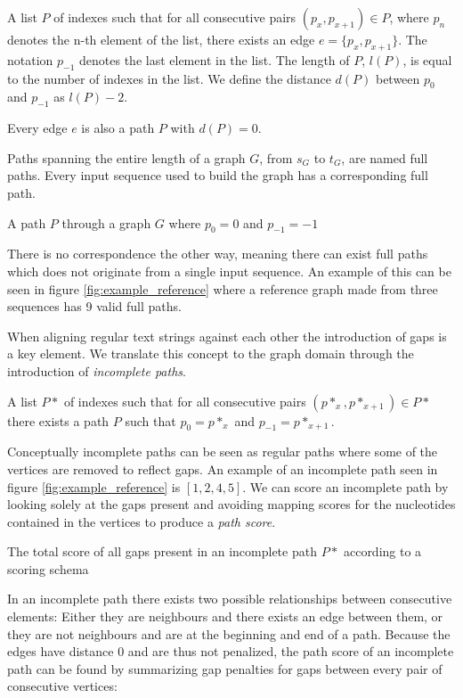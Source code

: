 \documentclass[thesis.tex]{subfiles}
\begin{document}
{\begin{defn}
  A list $P$ of indexes such that for all consecutive pairs $(p_x, p_{x+1}) \in P$, where $p_n$ denotes the n-th element of the list, there exists an edge $e=\{p_x, p_{x+1}\}$. The notation $p_{-1}$ denotes the last element in the list. The length of $P$, $l(P)$, is equal to the number of indexes in the list. We define the distance $d(P)$ between $p_0$ and $p_{-1}$ as $l(P) - 2$.
\end{defn}
\begin{corollary}
  Every edge $e$ is also a path $P$ with $d(P)=0$.
\end{corollary}
Paths spanning the entire length of a graph $G$, from $s_G$ to $t_G$, are named full paths. Every input sequence used to build the graph has a corresponding full path.
\begin{defn}
  A path $P$ through a graph $G$ where $p_0=0$ and $p_{-1}=-1$
\end{defn}
There is no correspondence the other way, meaning there can exist full paths which does not originate from a single input sequence. An example of this can be seen in figure \ref{fig:example_reference} where a reference graph made from three sequences has 9 valid full paths.\\
\par\noindent
When aligning regular text strings against each other the introduction of gaps is a key element. We translate this concept to the graph domain through the introduction of \textit{incomplete paths}.
\begin{defn}
  A list $P*$ of indexes such that for all consecutive pairs $(p*_x, p*_{x+1}) \in P*$ there exists a path $P$ such that $p_0=p*_x$ and $p_{-1}=p*_{x+1}$.
\end{defn}
Conceptually incomplete paths can be seen as regular paths where some of the vertices are removed to reflect gaps. An example of an incomplete path seen in figure \ref{fig:example_reference} is $[1, 2, 4, 5]$. We can score an incomplete path by looking solely at the gaps present and avoiding mapping scores for the nucleotides contained in the vertices to produce a \textit{path score}. 
\begin{defn}
  The total score of all gaps present in an incomplete path $P*$ according to a scoring schema
\end{defn}
In an incomplete path there exists two possible relationships between consecutive elements: Either they are neighbours and there exists an edge between them, or they are not neighbours and are at the beginning and end of a path. Because the edges have distance $0$ and are thus not penalized, the path score of an incomplete path can be found by summarizing gap penalties for gaps between every pair of consecutive vertices:
}
\end{document}
